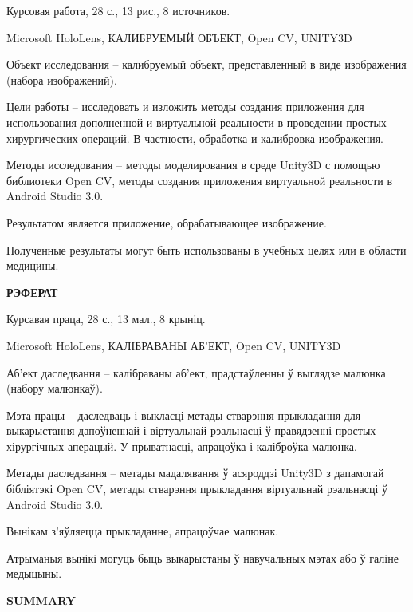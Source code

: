 \documentclass[a4paper, 14pt]{extreport} %
\begin{document}
	Курсовая работа, 28 с., 13 рис., 8 источников.
		
	Microsoft HoloLens, КАЛИБРУЕМЫЙ ОБЪЕКТ, Open CV, UNITY3D
		
	Объект исследования – калибруемый объект, представленный в виде изображения (набора изображений).
		
	Цели работы – исследовать и изложить методы создания приложения для использования дополненной и виртуальной реальности в проведении простых хирургических операций. В частности, обработка и калибровка изображения.
		
	Методы исследования – методы моделирования в среде Unity3D с помощью библиотеки Open CV, методы создания приложения виртуальной реальности в Android Studio 3.0.
	
	Результатом является приложение, обрабатывающее изображение.
		
	Полученные результаты могут быть использованы в учебных целях или в области медицины.
	
	\vspace{1cm}
\begin{center}
	\fontsize{14pt}{14pt}\selectfont
	\textbf{РЭФЕРАТ}\\
\end{center}

	
	Курсавая праца, 28 с., 13 мал., 8 крыніц.
	
	Microsoft HoloLens, КАЛІБРАВАНЫ АБ’ЕКТ, Open CV, UNITY3D
	
	Аб’ект даследвання – калібраваны аб’ект, прадстаўленны ў выглядзе малюнка (набору малюнкаў).
	
	Мэта працы – даследваць і выкласці метады стварэння прыкладання для выкарыстання дапоўненнай і віртуальнай рэальнасці ў правядзенні простых хірургічных аперацый. У прыватнасці, апрацоўка і каліброўка малюнка.
	
	Метады даследвання – метады мадалявання ў асяроддзі Unity3D з дапамогай бібліятэкі Open CV, метады стварэння прыкладання віртуальнай рэальнасці ў Android Studio 3.0.
	
	Вынікам   з’яўляецца прыкладанне, апрацоўчае малюнак.
	
	Атрыманыя вынікі могуць быць выкарыстаны ў навучальных мэтах або ў галіне медыцыны.
	
	\vspace{0.5cm}
\begin{center}
	\fontsize{14pt}{14pt}\selectfont
	\textbf{SUMMARY}\\
\end{center}
\end{document}
